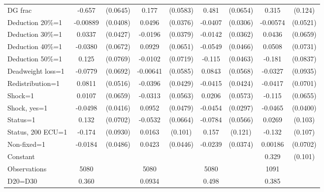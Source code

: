 \begin{tabular}{l|cccccc|cc}
DG frac         &   -0.657\sym{***}& (0.0645)&    0.177\sym{***}& (0.0583)&    0.481\sym{***}& (0.0654)&    0.315\sym{**} &  (0.124)\\
Deduction 20\%=1& -0.00889         & (0.0408)&   0.0496         & (0.0376)&  -0.0407         & (0.0306)& -0.00574         & (0.0521)\\
Deduction 30\%=1&   0.0337         & (0.0427)&  -0.0196         & (0.0379)&  -0.0142         & (0.0362)&   0.0436         & (0.0659)\\
Deduction 40\%=1&  -0.0380         & (0.0672)&   0.0929         & (0.0651)&  -0.0549         & (0.0466)&   0.0508         & (0.0731)\\
Deduction 50\%=1&    0.125         & (0.0769)&  -0.0102         & (0.0719)&   -0.115\sym{**} & (0.0463)&   -0.181\sym{**} & (0.0837)\\
Deadweight loss=1&  -0.0779         & (0.0692)& -0.00641         & (0.0585)&   0.0843         & (0.0568)&  -0.0327         & (0.0935)\\
Redistribution=1&   0.0811         & (0.0516)&  -0.0396         & (0.0429)&  -0.0415         & (0.0424)&  -0.0417         & (0.0701)\\
Shock=1         &   0.0107         & (0.0659)&  -0.0313         & (0.0563)&   0.0206         & (0.0573)&   -0.115\sym{*}  & (0.0655)\\
Shock, yes=1    &  -0.0498         & (0.0416)&   0.0952\sym{**} & (0.0479)&  -0.0454         & (0.0297)&  -0.0465         & (0.0400)\\
Status=1        &    0.132\sym{*}  & (0.0702)&  -0.0532         & (0.0664)&  -0.0784         & (0.0566)&   0.0269         &  (0.103)\\
Status, 200 ECU=1&   -0.174\sym{*}  & (0.0930)&   0.0163         &  (0.101)&    0.157         &  (0.121)&   -0.132         &  (0.107)\\
Non-fixed=1     &  -0.0184         & (0.0486)&   0.0423         & (0.0446)&  -0.0239         & (0.0374)&  0.00186         & (0.0702)\\
Constant        &                  &         &                  &         &                  &         &    0.329\sym{***}&  (0.101)\\
\hline
Observations    &     5080         &         &     5080         &         &     5080         &         &     1091         &         \\
D20=D30         &    0.360         &         &   0.0934         &         &    0.498         &         &    0.385         &         \\

\end{tabular}
